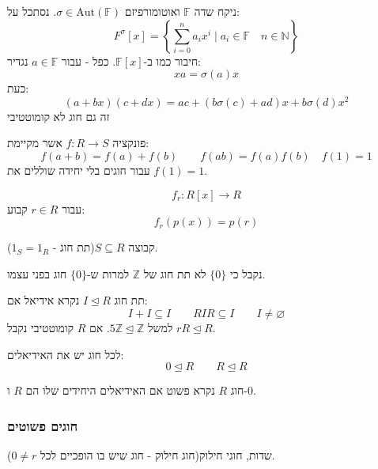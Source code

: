 \documentclass{tstextbook}
\begin{document}
\begin{definition}
ניקח שדה \(\mathbb{F}\) ואוטומורפיזם \(\sigma \in \mathrm{Aut}(\mathbb{F})\). נסתכל על:
$$F^{\sigma}[x]=\left\{  \sum_{i=0}^{n}a_{i}x^{i}\mid a_{i}\in \mathbb{F} \quad n \in \mathbb{N}  \right\}$$
חיבור כמו ב-\(\mathbb{F}[x]\). כפל - עבור \(a\in \mathbb{F}\) נגדיר:
$$xa=\sigma(a)x$$
כעת:
$$(a+bx)(c+dx)=ac+(b\sigma(c)+ad)x+b\sigma(d)x^{2}$$
זה גם חוג לא קומוטטיבי

\end{definition}
\begin{definition}
פונקציה \(f:R\to S\) אשר מקיימת:
$$f(a+b)=f(a)+f(b)\qquad f(ab)=f(a)f(b)\quad f(1)=1$$
עבור חוגים בלי יחידה שוללים את \(f(1)=1\).

\end{definition}
\begin{example}
$$f_{r}:R[x]\to R$$
עבור \(r \in R\) קבוע:
$$f_{r}(p(x))=p(r)$$

\end{example}
\begin{definition}[תת חוג]
קבוצה \(S \subseteq R\)(תת חוג - \(1_{S}=1_{R}\)).

\end{definition}
\begin{remark}
נקבל כי \(\{ 0 \}\) לא תת חוג של \(\mathbb{Z}\) למרות ש-\(\{ 0 \}\) חוג בפני עצמו.

\end{remark}
\begin{definition}[אידיאל]
תת חוג \(I\trianglelefteq R\) נקרא אידיאל אם:
$$I+I\subseteq I\qquad RIR\subseteq I\qquad I\neq \varnothing $$
למשל \(5\mathbb{Z}\trianglelefteq \mathbb{Z}\). אם \(R\) קומוטטיבי נקבל \(rR\trianglelefteq R\).

\end{definition}
\begin{proposition}
לכל חוג יש את האידיאלים:
$$0\trianglelefteq  R \qquad R \trianglelefteq  R$$

\end{proposition}
\begin{definition}
חוג \(R\) נקרא פשוט אם האידיאלים היחידים שלו הם \(R\) ו-\(0\).

\end{definition}
\subsubsection{חוגים פשוטים}

שדות, חוגי חילוק(חוג חילוק - חוג שיש בו הופכיים לכל \(0\neq r\)).
\end{document}
